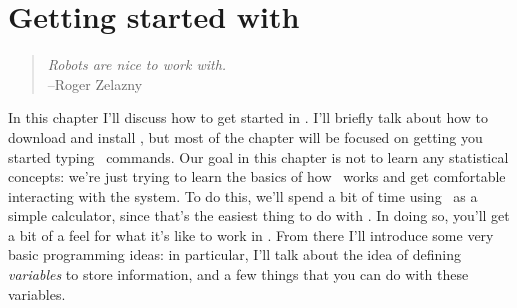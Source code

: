 

\chapter{Getting started with \R~\label{ch:introR}}

\begin{quote}
{\it Robots are nice to work with.}\\ 
\hspace*{2cm}--Roger Zelazny
\end{quote}


\noindent
In this chapter I'll discuss how to get started in \R. I'll briefly talk about how to download and install \R, but most of the chapter will be focused on getting you started typing \R\ commands. Our goal in this chapter is not to learn any statistical concepts: we're just trying to learn the basics of how \R\ works and get comfortable interacting with the system. To do this, we'll spend a bit of time using \R\ as a simple calculator, since that's the easiest thing to do with \R. In doing so, you'll get a bit of a feel for what it's like to work in \R. From there I'll introduce some very basic programming ideas: in particular, I'll talk about the idea of defining {\it variables} to store information, and a few things that you can do with these variables. 

